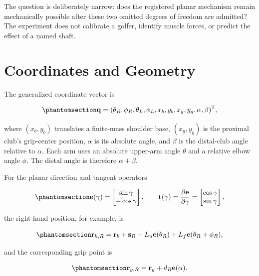 \documentclass[
  letterpaper,
]{report}
\begin{document}
The question is deliberately narrow: does the registered planar
mechanism remain mechanically possible after these two omitted degrees
of freedom are admitted? The experiment does not calibrate a golfer,
identify muscle forces, or predict the effect of a named shaft.

\section{Coordinates and Geometry}\label{sec-coupled-coordinates}

The generalized coordinate vector is

\begin{equation}\phantomsection\label{eq-coupled-state}{
\mathbf q =
(\theta_R,\phi_R,\theta_L,\phi_L,x_b,y_b,x_g,y_g,\alpha,\beta)^\mathsf T,
}\end{equation}

where \((x_b,y_b)\) translates a finite-mass shoulder base,
\((x_g,y_g)\) is the proximal club's grip-center position, \(\alpha\) is
its absolute angle, and \(\beta\) is the distal-club angle relative to
\(\alpha\). Each arm uses an absolute upper-arm angle \(\theta\) and a
relative elbow angle \(\phi\). The distal angle is therefore
\(\alpha+\beta\).

For the planar direction and tangent operators

\begin{equation}\phantomsection\label{eq-coupled-direction}{
\mathbf e(\gamma)=
\begin{bmatrix}\sin\gamma\\-\cos\gamma\end{bmatrix},
\qquad
\mathbf t(\gamma)=
\frac{\partial\mathbf e}{\partial\gamma}=
\begin{bmatrix}\cos\gamma\\\sin\gamma\end{bmatrix},
}\end{equation}

the right-hand position, for example, is

\begin{equation}\phantomsection\label{eq-coupled-hand-position}{
\mathbf r_{h,R}=\mathbf r_b+\mathbf s_R
+L_u\mathbf e(\theta_R)
+L_f\mathbf e(\theta_R+\phi_R),
}\end{equation}

and the corresponding grip point is

\begin{equation}\phantomsection\label{eq-coupled-grip-position}{
\mathbf r_{g,R}=\mathbf r_g+d_R\mathbf e(\alpha).
}\end{equation}
\end{document}
